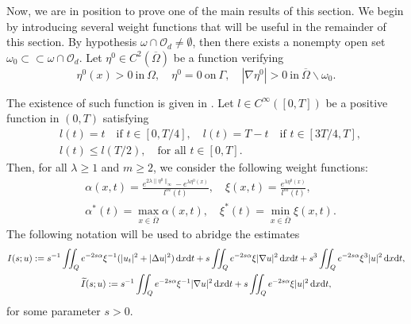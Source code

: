 \documentclass{aims}
\theoremstyle{definition}
\def\dx{\,\textnormal{d}x}
\def\dt{\textnormal{d}t}
\begin{document}
Now, we are in position to prove one of the main results of this section. We begin by introducing several weight functions that will be useful in the remainder of this section. By hypothesis $\omega\cap\mathcal O_d\neq \emptyset$, then there exists a nonempty open set $\omega_0\subset\subset\omega\cap\mathcal O_d$. Let $\eta^0\in C^2(\overline\Omega)$ be a function verifying
%
\begin{equation}\label{constr_1}
\eta^0(x)>0 \ \text{in} \ \Omega, \quad \eta^0=0 \ \text{on} \ \Gamma, \quad |\nabla\eta^0|>0 \ \text{in} \ \overline{\Omega}\backslash\omega_0.
\end{equation}
%

The existence of such function is given in \cite{fursi}. Let $l\in C^\infty([0,T])$ be a positive function in $(0,T)$ satisfying 
%
\begin{equation*}
\begin{split}
&l(t)=t \quad \text{if } t\in [0,T/4], \quad l(t)=T-t \quad \text{if } t\in [3T/4,T], \\
&l(t)\leq l(T/2), \quad \text{for all } t\in[0,T]. 
\end{split}
\end{equation*}
%
Then, for all $\lambda\geq 1$ and $m\geq 2$, we consider the following weight functions:
%
\begin{equation}\label{weights_l} 
\begin{split}
&\alpha(x,t)= \frac{e^{2\lambda\|\eta^0\|_\infty}-e^{\lambda\eta^0(x)}}{l^m(t)}, \quad \xi(x,t)=\frac{e^{\lambda \eta^0(x)}}{l^m(t)}, \\
&\alpha^*(t)=\max_{x\in\overline{\Omega}}\alpha(x,t), \quad \xi^*(t)=\min_{x\in\overline\Omega} \xi(x,t).
\end{split}
\end{equation}
%
The following notation will be used to abridge the estimates
%
\begin{equation*} 
\begin{gathered}
I(s;u):=s^{-1}\iint_{Q}e^{-2s\alpha}\xi^{-1}(|u_t|^2+|\Delta u|^2)\dx\dt+s\iint_Qe^{-2s\alpha}\xi|\nabla u|^2\dx\dt+s^3\iint_Qe^{-2s\alpha}\xi^3|u|^2\dx\dt, \\
\widetilde I(s;u):=s^{-1}\iint_{Q}e^{-2s\alpha}\xi^{-1}|\nabla u|^2\dx\dt+s\iint_{Q}e^{-2s\alpha}\xi |u|^2\dx\dt,
\end{gathered}
\end{equation*}
%
for some parameter $s>0$. 
\end{document}
